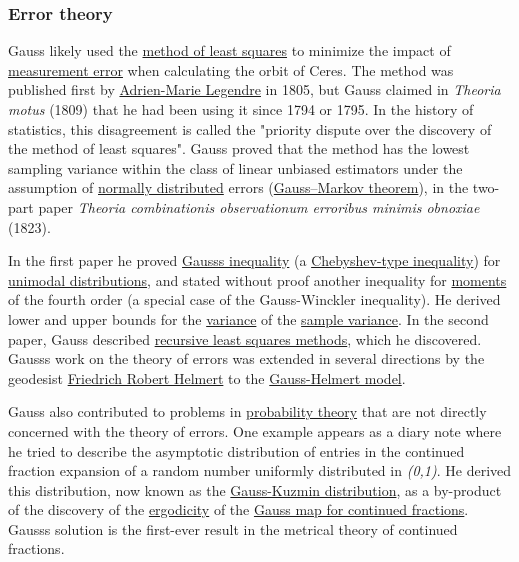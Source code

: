 \subsubsection{Error theory}\label{Error_theory}

Gauss likely used the \href{https://en.wikipedia.org/wiki/Least_squares}{method of least squares} to minimize the impact of \href{https://en.wikipedia.org/wiki/Observational_error}{measurement error} when calculating the orbit of Ceres. The method was published first by \href{https://en.wikipedia.org/wiki/Adrien-Marie_Legendre}{Adrien-Marie Legendre} in 1805, but Gauss claimed in \emph{Theoria motus} (1809) that he had been using it since 1794 or 1795. In the history of statistics, this disagreement is called the "priority dispute over the discovery of the method of least squares". Gauss proved that the method has the lowest sampling variance within the class of linear unbiased estimators under the assumption of \href{https://en.wikipedia.org/wiki/Normal_distribution}{normally distributed} errors (\href{https://en.wikipedia.org/wiki/Gauss–Markov_theorem}{Gauss--Markov theorem}), in the two-part paper \emph{Theoria combinationis observationum erroribus minimis obnoxiae} (1823).

In the first paper he proved \href{https://en.wikipedia.org/wiki/Gauss's_inequality}{Gauss\textquotesingle s inequality} (a \href{https://en.wikipedia.org/wiki/Chebyshev's_inequality}{Chebyshev-type inequality}) for \href{https://en.wikipedia.org/wiki/Unimodality}{unimodal distributions}, and stated without proof another inequality for \href{https://en.wikipedia.org/wiki/Moment_(mathematics)}{moments} of the fourth order (a special case of the Gauss-Winckler inequality). He derived lower and upper bounds for the \href{https://en.wikipedia.org/wiki/Variance}{variance} of the \href{https://en.wikipedia.org/wiki/Sample_variance}{sample variance}. In the second paper, Gauss described \href{https://en.wikipedia.org/wiki/Recursive_least_squares_filter}{recursive least squares methods}, which he discovered. Gauss\textquotesingle s work on the theory of errors was extended in several directions by the geodesist \href{https://en.wikipedia.org/wiki/Friedrich_Robert_Helmert}{Friedrich Robert Helmert} to the \href{https://en.wikipedia.org/wiki/Gauss-Helmert_model}{Gauss-Helmert model}.

Gauss also contributed to problems in \href{https://en.wikipedia.org/wiki/Probability_theory}{probability theory} that are not directly concerned with the theory of errors. One example appears as a diary note where he tried to describe the asymptotic distribution of entries in the continued fraction expansion of a random number uniformly distributed in \emph{(0,1)}. He derived this distribution, now known as the \href{https://en.wikipedia.org/wiki/Gauss-Kuzmin_distribution}{Gauss-Kuzmin distribution}, as a by-product of the discovery of the \href{https://en.wikipedia.org/wiki/Ergodicity}{ergodicity} of the \href{https://en.wikipedia.org/wiki/Gauss-Kuzmin-Wirsing_operator}{Gauss map for continued fractions}. Gauss\textquotesingle s solution is the first-ever result in the metrical theory of continued fractions.


